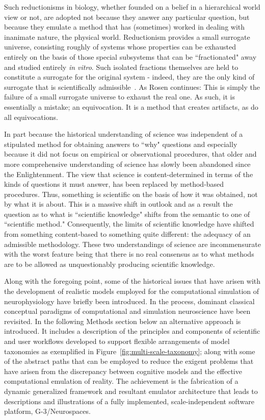 \documentclass[11pt,3p,twocolumn]{JMN}
\begin{document}
Such reductionisms in biology, whether founded on a belief in a hierarchical world view or not, are adopted not because they answer any particular question, but because they emulate a method that has (sometimes) worked in dealing with inanimate nature, the physical world. Reductionism provides a small surrogate universe, consisting roughly of systems whose properties can be exhausted entirely on the basis of those special subsystems that can be ``fractionated" away and studied entirely \textit{in vitro}. Such isolated fractions themselves are held to constitute a surrogate for the original system - indeed, they are the only kind of surrogate that is scientifically admissible~\citep{rosen96}. As Rosen continues: This is simply the failure of a small surrogate universe to exhaust the real one. As such, it is essentially a mistake; an equivocation. It is a method that creates artifacts, as do all equivocations.

In part because the historical understanding of science was independent of a stipulated method for obtaining answers to ``why" questions and especially because it did not focus on empirical or observational procedures, that older and more comprehensive understanding of science has slowly been abandoned since the Enlightenment. The view that science is content-determined in terms of the kinds of questions it must answer, has been replaced by method-based procedures. Thus, something is scientific on the basis of how it was obtained, not by what it is about. This is a massive shift in outlook and as a result the question as to what is ``scientific knowledge" shifts from the semantic to one of ``scientific method." Consequently, the limits of scientific knowledge have shifted from something content-based to something quite different: the adequacy of an admissible methodology. These two understandings of science are incommensurate with the worst feature being that there is no real consensus as to what methods are to be allowed as unquestionably producing scientific knowledge.

Along with the foregoing point, some of the historical issues that have arisen with the development of realistic models employed for the computational simulation of neurophysiology have briefly been introduced. In the process, dominant classical conceptual paradigms of computational and simulation neuroscience have been revisited. In the following Methods section below an alternative approach is introduced. It includes a description of the principles and components of scientific and user workflows developed to support flexible arrangements of model taxonomies as exemplified in Figure~\ref{fig:multi-scale-taxonomy}; along with some of the abstract paths that can be employed to reduce the exigent problems that have arisen from the discrepancy between cognitive models and the effective computational emulation of reality. The achievement is the fabrication of a dynamic generalized framework and resultant emulator architecture that leads to descriptions and illustrations of a fully implemented, scale-independent software platform, G-3/Neurospaces.
\end{document}
